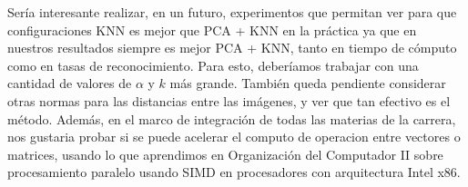Sería interesante realizar, en un futuro, experimentos que permitan ver para que configuraciones KNN es mejor que PCA + KNN en la práctica ya que en nuestros resultados siempre es mejor PCA + KNN, tanto en tiempo de cómputo como en tasas de reconocimiento. Para esto, deberíamos trabajar con una cantidad de valores de $\alpha$ y $k$ más grande. También queda pendiente considerar otras normas para las distancias entre las imágenes, y ver que tan efectivo es el método. Además, en el marco de integración de todas las materias de la carrera, nos gustaria probar si se puede acelerar el computo de operacion entre vectores o matrices, usando lo que aprendimos en Organización del Computador II sobre procesamiento paralelo usando SIMD en procesadores con arquitectura Intel x86.

